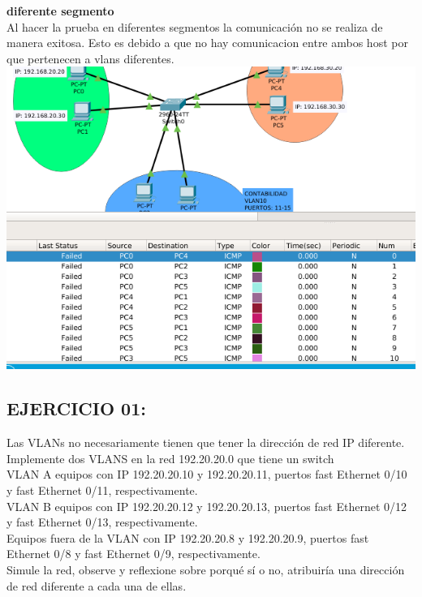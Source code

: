 \textbf{diferente segmento} \\
Al hacer la prueba en diferentes segmentos la comunicaci\'on no se realiza de manera exitosa. Esto es debido a que no hay comunicacion entre ambos host por que pertenecen a vlans diferentes.\\
\includegraphics[scale=0.5]{img/segdif.png}  

\subsection{EJERCICIO 01:}
\begin{definicion}[]{
Las VLANs no necesariamente tienen que tener la direcci\'on
de red IP diferente. Implemente dos VLANS en la red
192.20.20.0 que tiene un switch\\
VLAN A equipos con IP 192.20.20.10 y 192.20.20.11, puertos
fast Ethernet 0/10 y fast Ethernet 0/11, respectivamente.\\
VLAN B equipos con IP 192.20.20.12 y 192.20.20.13, puertos
fast Ethernet 0/12 y fast Ethernet 0/13, respectivamente.\\
Equipos fuera de la VLAN con IP 192.20.20.8 y 192.20.20.9,
puertos
fast
Ethernet
0/8
y
fast
Ethernet
0/9,
respectivamente.\\
Simule la red, observe y reflexione sobre porqu\'e s\'i o no,
atribuir\'ia una direcci\'on de red diferente a cada una de
ellas.
}
\end{definicion}

